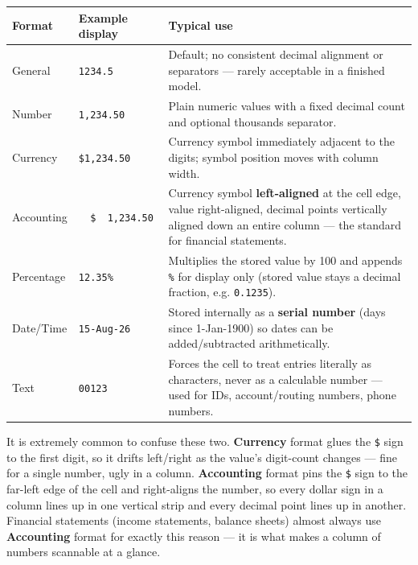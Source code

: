 \documentclass[11pt,a4paper]{article}
\begin{document}
\begin{center}
\begin{tabular}{@{}p{2.6cm}p{4.2cm}p{5.4cm}@{}}
\toprule
\textbf{Format} & \textbf{Example display} & \textbf{Typical use} \\
\midrule
General & \texttt{1234.5} & Default; no consistent decimal alignment or separators --- rarely acceptable in a finished model. \\
Number & \texttt{1,234.50} & Plain numeric values with a fixed decimal count and optional thousands separator. \\
Currency & \texttt{\$1,234.50} & Currency symbol immediately adjacent to the digits; symbol position moves with column width. \\
Accounting & \texttt{\ \ \$\ \ 1,234.50} & Currency symbol \textbf{left-aligned} at the cell edge, value right-aligned, decimal points vertically aligned down an entire column --- the standard for financial statements. \\
Percentage & \texttt{12.35\%} & Multiplies the stored value by 100 and appends \texttt{\%} for display only (stored value stays a decimal fraction, e.g. \texttt{0.1235}). \\
Date/Time & \texttt{15-Aug-26} & Stored internally as a \textbf{serial number} (days since 1-Jan-1900) so dates can be added/subtracted arithmetically. \\
Text & \texttt{00123} & Forces the cell to treat entries literally as characters, never as a calculable number --- used for IDs, account/routing numbers, phone numbers. \\
\bottomrule
\end{tabular}
\end{center}

\begin{pitfall}
It is extremely common to confuse these two. \textbf{Currency} format glues the \texttt{\$} sign to the first digit, so it drifts left/right as the value's digit-count changes --- fine for a single number, ugly in a column. \textbf{Accounting} format pins the \texttt{\$} sign to the far-left edge of the cell and right-aligns the number, so every dollar sign in a column lines up in one vertical strip and every decimal point lines up in another. Financial statements (income statements, balance sheets) almost always use \textbf{Accounting} format for exactly this reason --- it is what makes a column of numbers scannable at a glance.
\end{pitfall}
\end{document}

